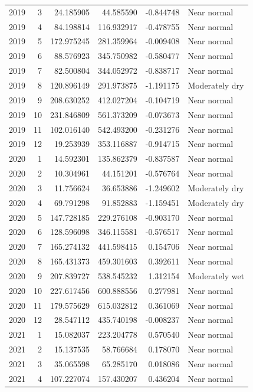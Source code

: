 \begin{tabular}{rrrrrl}
2019 & 3 & 24.185905 & 44.585590 & -0.844748 & Near normal \\
2019 & 4 & 84.198814 & 116.932917 & -0.478755 & Near normal \\
2019 & 5 & 172.975245 & 281.359964 & -0.009408 & Near normal \\
2019 & 6 & 88.576923 & 345.750982 & -0.580477 & Near normal \\
2019 & 7 & 82.500804 & 344.052972 & -0.838717 & Near normal \\
2019 & 8 & 120.896149 & 291.973875 & -1.191175 & Moderately dry \\
2019 & 9 & 208.630252 & 412.027204 & -0.104719 & Near normal \\
2019 & 10 & 231.846809 & 561.373209 & -0.073673 & Near normal \\
2019 & 11 & 102.016140 & 542.493200 & -0.231276 & Near normal \\
2019 & 12 & 19.253939 & 353.116887 & -0.914715 & Near normal \\
2020 & 1 & 14.592301 & 135.862379 & -0.837587 & Near normal \\
2020 & 2 & 10.304961 & 44.151201 & -0.576764 & Near normal \\
2020 & 3 & 11.756624 & 36.653886 & -1.249602 & Moderately dry \\
2020 & 4 & 69.791298 & 91.852883 & -1.159451 & Moderately dry \\
2020 & 5 & 147.728185 & 229.276108 & -0.903170 & Near normal \\
2020 & 6 & 128.596098 & 346.115581 & -0.576517 & Near normal \\
2020 & 7 & 165.274132 & 441.598415 & 0.154706 & Near normal \\
2020 & 8 & 165.431373 & 459.301603 & 0.392611 & Near normal \\
2020 & 9 & 207.839727 & 538.545232 & 1.312154 & Moderately wet \\
2020 & 10 & 227.617456 & 600.888556 & 0.277981 & Near normal \\
2020 & 11 & 179.575629 & 615.032812 & 0.361069 & Near normal \\
2020 & 12 & 28.547112 & 435.740198 & -0.008237 & Near normal \\
2021 & 1 & 15.082037 & 223.204778 & 0.570540 & Near normal \\
2021 & 2 & 15.137535 & 58.766684 & 0.178070 & Near normal \\
2021 & 3 & 35.065598 & 65.285170 & 0.018086 & Near normal \\
2021 & 4 & 107.227074 & 157.430207 & 0.436204 & Near normal \\

\end{tabular}
